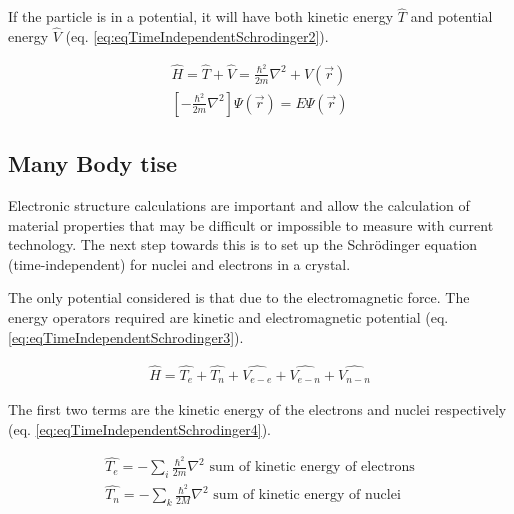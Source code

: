 If the particle is in a potential, it will have both kinetic energy $\hat{T}$ and potential energy $\hat{V}$ (eq. \ref{eq:eqTimeIndependentSchrodinger2}).

\begin{equation}
\begin{split}
\hat{H} = \hat{T} + \hat{V} = \frac{\hbar^2}{2 m} \nabla^2 + V(\vec{r})\\
\left[-\frac{\hbar^2}{2 m} \nabla^2 \right] \Psi(\vec{r}) = E \Psi(\vec{r})
\end{split}
\label{eq:eqTimeIndependentSchrodinger2}
\end{equation}




\subsection{Many Body \acrshort{tise}}

Electronic structure calculations are important and allow the calculation of material properties that may be difficult or impossible to measure with current technology.  The next step towards this is to set up the Schr\"{o}dinger equation (time-independent) for nuclei and electrons in a crystal.  

The only potential considered is that due to the electromagnetic force.  The energy operators required are kinetic and electromagnetic potential (eq. \ref{eq:eqTimeIndependentSchrodinger3}).

\begin{equation}
\begin{split}
\hat{H} = \hat{T_e} + \hat{T_n} + \hat{V_{e-e}} + \hat{V_{e-n}} + \hat{V_{n-n}}
\end{split}
\label{eq:eqTimeIndependentSchrodinger3}
\end{equation}

The first two terms are the kinetic energy of the electrons and nuclei respectively (eq. \ref{eq:eqTimeIndependentSchrodinger4}).

\begin{equation}
\begin{split}
\hat{T_e} = - \sum_{i} \frac{\hbar^2}{2 m}  \nabla^2 \text{  sum of kinetic energy of electrons} \\
\hat{T_n} = - \sum_{k} \frac{\hbar^2}{2 M}  \nabla^2 \text{  sum of kinetic energy of nuclei}
\end{split}
\label{eq:eqTimeIndependentSchrodinger4}
\end{equation}

